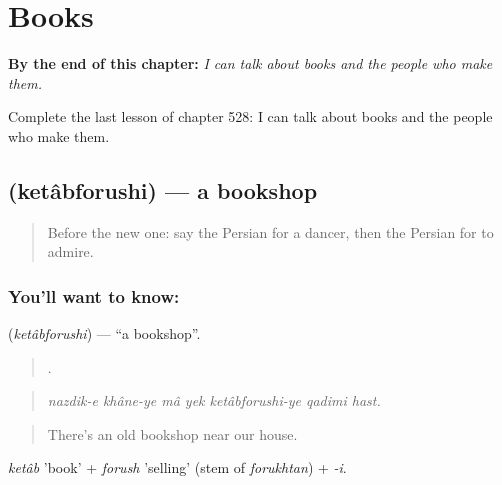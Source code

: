 
\chapter{Books}
\label{ch:fa-books}

\begin{chapteropening}
\textbf{By the end of this chapter:} \emph{I can talk about books and the people who make them.}

Complete the last lesson of chapter 528: I can talk about books and the people who make them.
\end{chapteropening}

\section[\texorpdfstring{\fa{کتابفروشی} (ketâbforushi)}{کتابفروشی (ketâbforushi)}]{ (ketâbforushi) — a bookshop}

\label{lesson:FA-C528-ketabforushi}



\begin{quote}
Before the new one: say the Persian for a dancer, then the Persian for to admire.
\end{quote}

\subsection*{You'll want to know: }
\textbf{} (\emph{ketâbforushi}) — \textquotedblleft{}a bookshop\textquotedblright{}.

\begin{quote}
      .
\end{quote}

\begin{quote}
\emph{nazdik-e khâne-ye mâ yek ketâbforushi-ye qadimi hast.}
\end{quote}

\begin{quote}
There's an old bookshop near our house.
\end{quote}

\emph{ketâb} 'book' + \emph{forush} 'selling' (stem of \emph{forukhtan}) + \emph{-i}.

